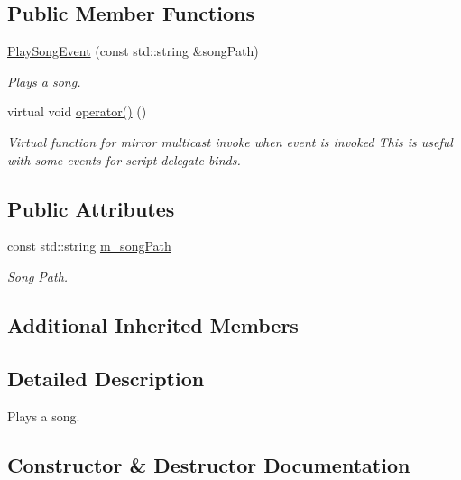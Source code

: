 \subsection*{Public Member Functions}
\begin{DoxyCompactItemize}
\item 
\hyperlink{classPlaySongEvent_ab40ab9ff92980db19f32dd68b46fe630}{Play\+Song\+Event} (const std\+::string \&song\+Path)
\begin{DoxyCompactList}\small\item\em Plays a song. \end{DoxyCompactList}\item 
\mbox{\label{classPlaySongEvent_afb5d89e800804670a2ab44ae003da68f}} 
virtual void \hyperlink{classPlaySongEvent_afb5d89e800804670a2ab44ae003da68f}{operator()} ()
\begin{DoxyCompactList}\small\item\em Virtual function for mirror multicast invoke when event is invoked This is useful with some events for script delegate binds. \end{DoxyCompactList}\end{DoxyCompactItemize}
\subsection*{Public Attributes}
\begin{DoxyCompactItemize}
\item 
\mbox{\label{classPlaySongEvent_a4559e1438dbb1c5208966dff0ca4d267}} 
const std\+::string \hyperlink{classPlaySongEvent_a4559e1438dbb1c5208966dff0ca4d267}{m\+\_\+song\+Path}
\begin{DoxyCompactList}\small\item\em Song Path. \end{DoxyCompactList}\end{DoxyCompactItemize}
\subsection*{Additional Inherited Members}


\subsection{Detailed Description}
Plays a song. 

\subsection{Constructor \& Destructor Documentation}
\mbox{\label{classPlaySongEvent_ab40ab9ff92980db19f32dd68b46fe630}} 
